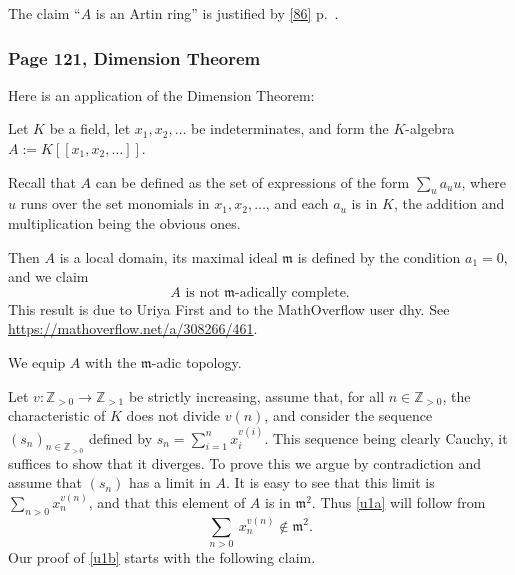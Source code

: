 \documentclass[12pt,letterpaper]{article}%
\newcommand{\mf}{\mathfrak}
\newcommand{\mmm}{\mf m}
\begin{document}
The claim ``$A$ is an Artin ring'' is justified by \eqref{86} p.~\pageref{86}.%

\subsubsection{Page 121, Dimension Theorem}%

Here is an application of the Dimension Theorem: 

Let $K$ be a field, let $x_1,x_2,\dots$ be indeterminates, and form the $K$-algebra $A:=K[[x_1,x_2,\dots]]$. 

Recall that $A$ can be defined as the set of expressions of the form $\sum_ua_uu$, where $u$ runs over the set monomials in $x_1,x_2,\dots$, and each $a_u$ is in $K$, the addition and multiplication being the obvious ones. 

Then $A$ is a local domain, its maximal ideal $\mathfrak m$ is defined by the condition $a_1=0$, and we claim 
\begin{equation}\label{u1a}
\boxed{A\text{ is not }\mathfrak m\text{-adically complete.}}
\end{equation}
This result is due to Uriya First and to the MathOverflow user dhy. See\\ \href{https://mathoverflow.net/a/308266/461}{https://mathoverflow.net/a/308266/461}. 

We equip $A$ with the $\mmm$-adic topology.

Let $v:\mathbb Z_{>0}\to\mathbb Z_{>1}$ be strictly increasing, assume that, for all $n\in\mathbb Z_{>0}$, the characteristic of $K$ does not divide $v(n)$, and consider the sequence $(s_n)_{n\in\mathbb Z_{>0}}$ defined by $s_n=\sum_{i=1}^nx_i^{v(i)}$. This sequence being clearly Cauchy, it suffices to show that it diverges. To prove this we argue by contradiction and assume that $(s_n)$ has a limit in $A$. It is easy to see that this limit is $\sum_{n>0}x_n^{v(n)}$, and that this element of $A$ is in $\mmm^2$. Thus \eqref{u1a} will follow from 
\begin{equation}\label{u1b}
\sum_{n>0}\ x_n^{v(n)}\notin\mmm^2.
\end{equation} 
Our proof of \eqref{u1b} starts with the following claim.
\end{document}
